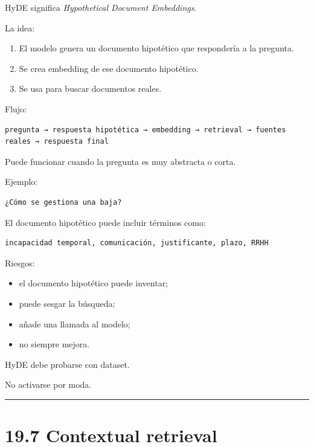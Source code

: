 HyDE significa \emph{Hypothetical Document Embeddings}.

La idea:

\begin{enumerate}
\def\labelenumi{\arabic{enumi}.}
\tightlist
\item
  El modelo genera un documento hipotético que respondería a la
  pregunta.
\item
  Se crea embedding de ese documento hipotético.
\item
  Se usa para buscar documentos reales.
\end{enumerate}

Flujo:

\begin{lstlisting}
pregunta → respuesta hipotética → embedding → retrieval → fuentes reales → respuesta final
\end{lstlisting}

Puede funcionar cuando la pregunta es muy abstracta o corta.

Ejemplo:

\begin{lstlisting}
¿Cómo se gestiona una baja?
\end{lstlisting}

El documento hipotético puede incluir términos como:

\begin{lstlisting}
incapacidad temporal, comunicación, justificante, plazo, RRHH
\end{lstlisting}

Riesgos:

\begin{itemize}
\tightlist
\item
  el documento hipotético puede inventar;
\item
  puede sesgar la búsqueda;
\item
  añade una llamada al modelo;
\item
  no siempre mejora.
\end{itemize}

HyDE debe probarse con dataset.

No activarse por moda.

\begin{center}\rule{0.5\linewidth}{0.5pt}\end{center}

\section{19.7 Contextual retrieval}\label{contextual-retrieval}

